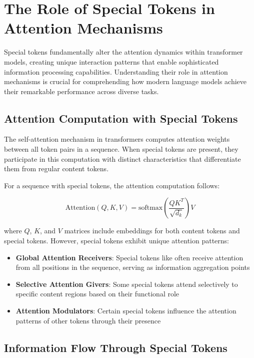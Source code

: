\section{The Role of Special Tokens in Attention Mechanisms}

Special tokens fundamentally alter the attention dynamics within transformer models, creating unique interaction patterns that enable sophisticated information processing capabilities. Understanding their role in attention mechanisms is crucial for comprehending how modern language models achieve their remarkable performance across diverse tasks.

\subsection{Attention Computation with Special Tokens}

The self-attention mechanism in transformers computes attention weights between all token pairs in a sequence. When special tokens are present, they participate in this computation with distinct characteristics that differentiate them from regular content tokens.

For a sequence with special tokens, the attention computation follows:

\begin{equation}
\text{Attention}(Q, K, V) = \text{softmax}\left(\frac{QK^T}{\sqrt{d_k}}\right)V
\end{equation}

where $Q$, $K$, and $V$ matrices include embeddings for both content tokens and special tokens. However, special tokens exhibit unique attention patterns:

\begin{itemize}
\item \textbf{Global Attention Receivers}: Special tokens like \cls{} often receive attention from all positions in the sequence, serving as information aggregation points
\item \textbf{Selective Attention Givers}: Some special tokens attend selectively to specific content regions based on their functional role
\item \textbf{Attention Modulators}: Certain special tokens influence the attention patterns of other tokens through their presence
\end{itemize}

\subsection{Information Flow Through Special Tokens}

